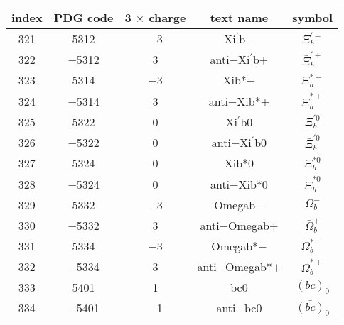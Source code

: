 \documentclass{article}
\begin{document}
\begin{table}[!htbp]
\centering
\begin{tabular}{|c|c|c|c|c|}
\hline
index & PDG code & 3 $\times$ charge & text name & symbol \\
\hline
321 & 5312 & $-$3 & Xi$^{\prime}$\underline{\hspace{0.6em}}b$-$ & $\Xi_{b}^{\prime-}$ \\
\hline
322 & $-$5312 & 3 & anti$-$Xi$^{\prime}$\underline{\hspace{0.6em}}b$+$ & $\bar{\Xi}_{b}^{\prime+}$ \\
\hline
323 & 5314 & $-$3 & Xi\underline{\hspace{0.6em}}b*$-$ & $\Xi_{b}^{*-}$ \\
\hline
324 & $-$5314 & 3 & anti$-$Xi\underline{\hspace{0.6em}}b*$+$ & $\bar{\Xi}_{b}^{*+}$ \\
\hline
325 & 5322 & 0 & Xi$^{\prime}$\underline{\hspace{0.6em}}b0 & $\Xi_{b}^{\prime0}$ \\
\hline
326 & $-$5322 & 0 & anti$-$Xi$^{\prime}$\underline{\hspace{0.6em}}b0 & $\bar{\Xi}_{b}^{\prime0}$ \\
\hline
327 & 5324 & 0 & Xi\underline{\hspace{0.6em}}b*0 & $\Xi_{b}^{*0}$ \\
\hline
328 & $-$5324 & 0 & anti$-$Xi\underline{\hspace{0.6em}}b*0 & $\bar{\Xi}_{b}^{*0}$ \\
\hline
329 & 5332 & $-$3 & Omega\underline{\hspace{0.6em}}b$-$ & $\Omega_{b}^{-}$ \\
\hline
330 & $-$5332 & 3 & anti$-$Omega\underline{\hspace{0.6em}}b$+$ & $\bar{\Omega}_{b}^{+}$ \\
\hline
331 & 5334 & $-$3 & Omega\underline{\hspace{0.6em}}b*$-$ & $\Omega_{b}^{*-}$ \\
\hline
332 & $-$5334 & 3 & anti$-$Omega\underline{\hspace{0.6em}}b*$+$ & $\bar{\Omega}_{b}^{*+}$ \\
\hline
333 & 5401 & 1 & bc\underline{\hspace{0.6em}}0 & $(bc)_{0}$ \\
\hline
334 & $-$5401 & $-$1 & anti$-$bc\underline{\hspace{0.6em}}0 & $\bar{(bc)}_{0}$ \\

\end{tabular}
\end{table}
\end{document}
